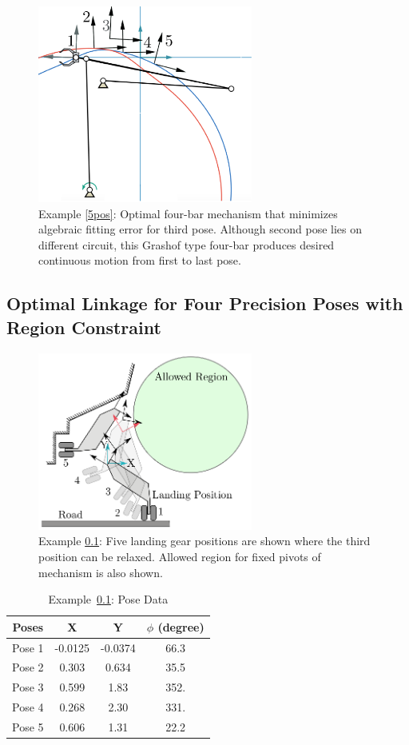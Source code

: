 \begin{figure}
\centering
\includegraphics[width=200pt]{jmr-17/figure/fig1.eps}
\caption{Example \ref{5pos}: Optimal four-bar mechanism that minimizes algebraic fitting error for third pose. Although second pose lies on different circuit, this Grashof type four-bar produces desired continuous motion from first to last pose.}
\label{5posgg}
\end{figure}

\subsection{Optimal Linkage for Four Precision Poses with Region Constraint}\label{4pos1line1pose}
\begin{figure}
\centering
\includegraphics[width=200pt]{jmr-17/figure/fig2.eps}
\caption{Example \ref{4pos1line1pose}: Five landing gear positions are shown where the third position can be relaxed. Allowed region for fixed pivots of mechanism is also shown.}
\label{4posproblem}
\end{figure}

\begin{table}
\caption{Example~\ref{4pos1line1pose}: Pose Data}
\centering
\label{4posMotion}
\begin{tabular}{cccc}
\hline
Poses & X & Y & $\phi$ (degree)\\
\hline
Pose 1 &  -0.0125 & -0.0374 & 66.3 \\
Pose 2 &  0.303 & 0.634 & 35.5 \\
Pose 3 &  0.599 & 1.83 & 352. \\
Pose 4 &  0.268 & 2.30 & 331. \\
Pose 5 &  0.606 & 1.31 & 22.2 \\
\hline
\end{tabular}
\end{table}

